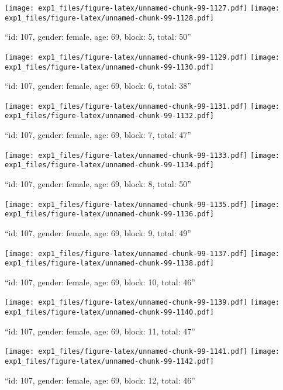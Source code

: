 \documentclass[,]{article}
\begin{document}
\texttt{[image: exp1\_files/figure-latex/unnamed-chunk-99-1127.pdf]}
\texttt{[image: exp1\_files/figure-latex/unnamed-chunk-99-1128.pdf]}

\newpage
[1] 

``id: 107, gender: female, age: 69, block: 5, total: 50''

\texttt{[image: exp1\_files/figure-latex/unnamed-chunk-99-1129.pdf]}
\texttt{[image: exp1\_files/figure-latex/unnamed-chunk-99-1130.pdf]}

\newpage
[1] 

``id: 107, gender: female, age: 69, block: 6, total: 38''

\texttt{[image: exp1\_files/figure-latex/unnamed-chunk-99-1131.pdf]}
\texttt{[image: exp1\_files/figure-latex/unnamed-chunk-99-1132.pdf]}

\newpage
[1] 

``id: 107, gender: female, age: 69, block: 7, total: 47''

\texttt{[image: exp1\_files/figure-latex/unnamed-chunk-99-1133.pdf]}
\texttt{[image: exp1\_files/figure-latex/unnamed-chunk-99-1134.pdf]}

\newpage
[1] 

``id: 107, gender: female, age: 69, block: 8, total: 50''

\texttt{[image: exp1\_files/figure-latex/unnamed-chunk-99-1135.pdf]}
\texttt{[image: exp1\_files/figure-latex/unnamed-chunk-99-1136.pdf]}

\newpage
[1] 

``id: 107, gender: female, age: 69, block: 9, total: 49''

\texttt{[image: exp1\_files/figure-latex/unnamed-chunk-99-1137.pdf]}
\texttt{[image: exp1\_files/figure-latex/unnamed-chunk-99-1138.pdf]}

\newpage
[1] 

``id: 107, gender: female, age: 69, block: 10, total: 46''

\texttt{[image: exp1\_files/figure-latex/unnamed-chunk-99-1139.pdf]}
\texttt{[image: exp1\_files/figure-latex/unnamed-chunk-99-1140.pdf]}

\newpage
[1] 

``id: 107, gender: female, age: 69, block: 11, total: 47''

\texttt{[image: exp1\_files/figure-latex/unnamed-chunk-99-1141.pdf]}
\texttt{[image: exp1\_files/figure-latex/unnamed-chunk-99-1142.pdf]}

\newpage
[1] 

``id: 107, gender: female, age: 69, block: 12, total: 46''
\end{document}

